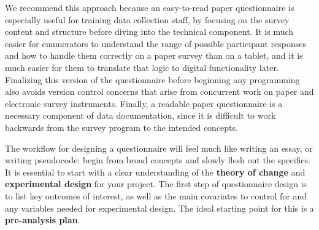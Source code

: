 We recommend this approach because an easy-to-read paper questionnaire
is especially useful for training data collection staff,
by focusing on the survey content and structure before diving into the technical component.
It is much easier for enumerators to understand the range of possible participant responses
and how to handle them correctly on a paper survey than on a tablet,
and it is much easier for them to translate that logic to digital functionality later.
Finalizing this version of the questionnaire before beginning any programming
also avoids version control concerns that arise from concurrent work
on paper and electronic survey instruments.
Finally, a readable paper questionnaire is a necessary component of data documentation,
since it is difficult to work backwards from the survey program to the intended concepts.

The workflow for designing a questionnaire will feel much like writing an essay, or writing pseudocode:
begin from broad concepts and slowly flesh out the specifics.
It is essential to start with a clear understanding of the
\textbf{theory of change}
and \textbf{experimental design} for your project.
The first step of questionnaire design is to list key outcomes of interest,
as well as the main covariates to control for and any variables needed for experimental design.
The ideal starting point for this is a \textbf{pre-analysis plan}.

